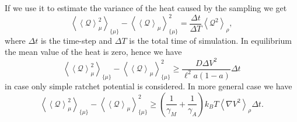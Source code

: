 \documentclass[11pt]{article}
\begin{document}
If we use it to estimate the variance of the heat caused by the sampling we get 
\[
\left\langle \left\langle {\mathcal Q} \right\rangle_\mu^2 \right\rangle_{\{\mu\}} - \left\langle \left\langle {\mathcal Q} \right\rangle_\mu \right\rangle_{\{\mu\}}^2  
= \frac{\Delta t}{\Delta T} \left\langle {\mathcal Q}^2 \right\rangle_\rho,  
\] 
where $\Delta t$ is the time-step and $\Delta T$ is the total time of simulation. 
In equilibrium the mean value of the heat is zero, hence we have
\[
\left\langle \left\langle {\mathcal Q} \right\rangle_\mu^2 \right\rangle_{\{\mu\}} - \left\langle \left\langle {\mathcal Q} \right\rangle_\mu \right\rangle_{\{\mu\}}^2 
\ge \frac{ D \Delta V^2 }{\ell^2 a (1-a) } \Delta t     
\]
in case only simple ratchet potential is considered. 
In more general case we have 
\[
\left\langle \left\langle {\mathcal Q} \right\rangle_\mu^2 \right\rangle_{\{\mu\}} - \left\langle \left\langle {\mathcal Q} \right\rangle_\mu \right\rangle_{\{\mu\}}^2 
\ge \left( \frac{1}{\gamma_M} + \frac{1}{\gamma_A} \right) k_B T \left\langle \nabla V^2 \right\rangle_\rho \Delta t .
\]
\end{document}
